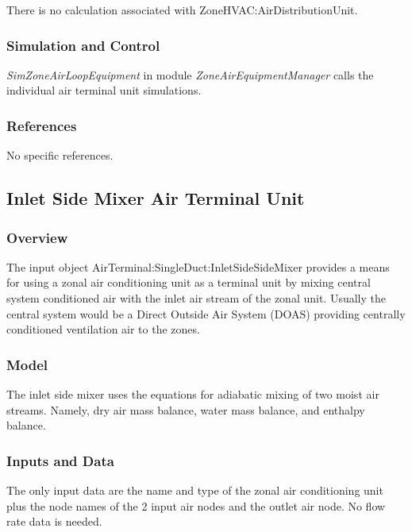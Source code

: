 There is no calculation associated with ZoneHVAC:AirDistributionUnit.

\subsubsection{Simulation and Control}\label{simulation-and-control-003}

\emph{SimZoneAirLoopEquipment} in module \emph{ZoneAirEquipmentManager} calls the individual air terminal unit simulations.

\subsubsection{References}\label{references-056}

No specific references.

\subsection{Inlet Side Mixer Air Terminal Unit}\label{inlet-side-mixer-air-terminal-unit}

\subsubsection{Overview}\label{overview-1-009}

The input object AirTerminal:SingleDuct:InletSideSideMixer provides a means for using a zonal air conditioning unit as a terminal unit by mixing central system conditioned air with the inlet air stream of the zonal unit. Usually the central system would be a Direct Outside Air System (DOAS) providing centrally conditioned ventilation air to the zones.

\subsubsection{Model}\label{model-1-000}

The inlet side mixer uses the equations for adiabatic mixing of two moist air streams. Namely, dry air mass balance, water mass balance, and enthalpy balance.

\subsubsection{Inputs and Data}\label{inputs-and-data-1-000}

The only input data are the name and type of the zonal air conditioning unit plus the node names of the 2 input air nodes and the outlet air node. No flow rate data is needed.

